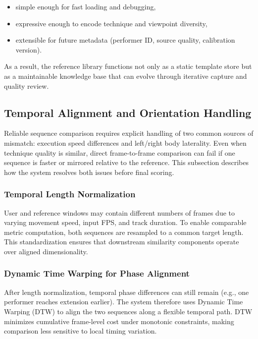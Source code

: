 \documentclass[12pt]{article}
\begin{document}
{\begin{itemize}
    \item simple enough for fast loading and debugging,
    \item expressive enough to encode technique and viewpoint diversity,
    \item extensible for future metadata (performer ID, source quality, calibration version).
\end{itemize}

As a result, the reference library functions not only as a static template store but as a maintainable knowledge base that can evolve through iterative capture and quality review.

\subsection{Temporal Alignment and Orientation Handling}

Reliable sequence comparison requires explicit handling of two common sources of mismatch: execution speed differences and left/right body laterality. Even when technique quality is similar, direct frame-to-frame comparison can fail if one sequence is faster or mirrored relative to the reference. This subsection describes how the system resolves both issues before final scoring.

\subsubsection{Temporal Length Normalization}

User and reference windows may contain different numbers of frames due to varying movement speed, input FPS, and track duration. To enable comparable metric computation, both sequences are resampled to a common target length. This standardization ensures that downstream similarity components operate over aligned dimensionality.

\subsubsection{Dynamic Time Warping for Phase Alignment}

After length normalization, temporal phase differences can still remain (e.g., one performer reaches extension earlier). The system therefore uses Dynamic Time Warping (DTW) to align the two sequences along a flexible temporal path. DTW minimizes cumulative frame-level cost under monotonic constraints, making comparison less sensitive to local timing variation.

}
\end{document}
